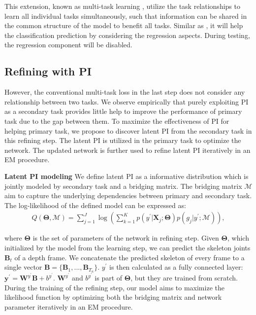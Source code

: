 \documentclass[10pt,twocolumn,letterpaper]{article}
\begin{document}
This extension, known as multi-task learning \cite{Mitchell_1997}, utilize the task relationships to learn all individual tasks simultaneously, such that information can be shared in the common structure of the model to benefit all tasks. Similar as \cite{girshick15fastrcnn}, it will help the classification prediction by considering the regression aspects. During testing, the regression component will be disabled.



\subsection{Refining with PI}
\label{sec:refine}

However, the conventional multi-task loss in the last step does not consider any relationship between two tasks. We observe empirically that purely exploiting PI as a secondary task provides little help to improve the performance of primary task due to the gap between them. To maximize the effectiveness of PI for helping primary task, we propose to discover latent PI from the secondary task in this refining step. The latent PI is utilized in the primary task to optimize the network. The updated network is further used to refine latent PI iteratively in an EM procedure.

\noindent \textbf{Latent PI modeling}  We define latent PI as a informative distribution which is jointly modeled by secondary task and a bridging matrix. The bridging matrix $\bm{\mathcal{M}}$ aim to capture the underlying dependencies between primary and secondary task. The log-likelihood of the defined model can be expressed as:
\begin{align}
Q(\bm{\Theta},\bm{\mathcal{M}}) = \sum_{j=1}^{J}\log(\sum_{k=1}^{K}p(y^{\prime}|\bm{X}_j;\bm{\Theta})p(g_j|y^{\prime};\bm{\mathcal{M}})),
\end{align}

where $\bm{\Theta}$ is the set of parameters of the network in refining step. Given $\bm{\Theta}$, which initialized by the model from the learning step, we can predict the skeleton joints $\bm{B}_t$ of a depth frame. We concatenate the predicted skeleton of every frame to a single vector $\bm{B}=\{\bm{B}_{1},...,\bm{B}_{T_n}\}$. $y^{\prime}$ is then calculated as a fully connected layer: $\bm{y^{\prime}}=\bm{W}^{y^{\prime}}\bm{B}+b^{y^{\prime}}$. $\bm{W}^{y^{\prime}}$ and $b^{y^{\prime}}$ is part of $\bm{\Theta}$, but they are trained from scratch. During the training of the refining step, our model aims to maximize the likelihood function by optimizing both the bridging matrix and network parameter iteratively in an EM procedure.
\end{document}
